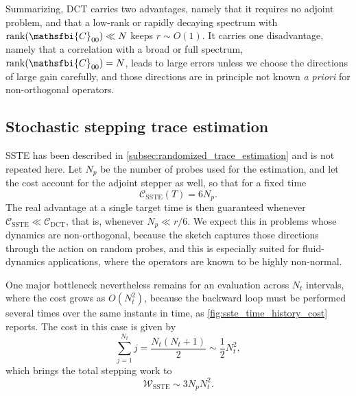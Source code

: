 Summarizing, DCT carries two advantages, namely that it requires no adjoint problem, and that a
low-rank or rapidly decaying spectrum with \(\mathrm{rank}(\mathsfbi{C}_{00})\ll N\) keeps
\(r\sim O(1)\). It carries one disadvantage, namely that a correlation with a broad or full
spectrum, \(\mathrm{rank}(\mathsfbi{C}_{00})=N\), leads to large errors unless we choose the
directions of large gain carefully, and those directions are in principle not known \emph{a priori}
for non-orthogonal operators.
\subsection{Stochastic stepping trace estimation}
\label{sec:appendix_sste_method}

SSTE has been described in \cref{subsec:randomized_trace_estimation} and is not repeated here. Let
\(N_p\) be the number of probes used for the estimation, and let the cost account for the adjoint
stepper as well, so that for a fixed time
\begin{equation}
  \mathcal{C}_{\mathrm{SSTE}}(T)=6N_p .
  \label{eq:sste_fixed_time_cost}
\end{equation}
The real advantage at a single target time is then guaranteed whenever
\(\mathcal{C}_{\mathrm{SSTE}}\ll\mathcal{C}_{\mathrm{DCT}}\), that is, whenever \(N_p\ll r/6\). We
expect this in problems whose dynamics are non-orthogonal, because the sketch captures those
directions through the action on random probes, and this is especially suited for fluid-dynamics
applications, where the operators are known to be highly non-normal.

One major bottleneck nevertheless remains for an evaluation across \(N_t\) intervals, where the
cost grows as \(O(N_t^{2})\), because the backward loop must be performed several times over the
same instants in time, as \cref{fig:sste_time_history_cost} reports. The cost in this case is given by
\begin{equation}
  \sum_{j=1}^{N_t} j
  =
  \frac{N_t(N_t+1)}{2}
  \sim
  \frac{1}{2}N_t^{2},
  \label{eq:sste_backward_sum}
\end{equation}
which brings the total stepping work to
\begin{equation}
  \mathcal{W}_{\mathrm{SSTE}}\sim3N_pN_t^{2}.
  \label{eq:sste_multiple_time_cost}
\end{equation}

